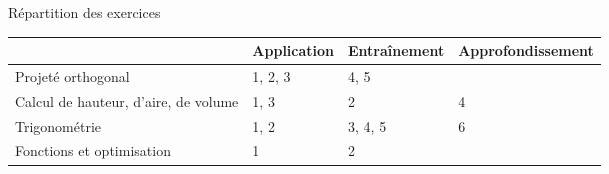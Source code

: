 \documentclass[12pt]{beamer}
\begin{document}
\begin{frame}{Répartition des exercices}

\begin{center}
\begin{tabular}{|P{.2\textwidth}|P{.17\textwidth}|P{.2\textwidth}|P{.28\textwidth}|}\hline
		& Application & Entraînement & Approfondissement \\ \hline
	Projeté orthogonal & 1, 2, 3 & 4, 5 & \\ \hline
	Calcul de hauteur, d'aire, de volume & 1, 3 & 2 & 4 \\ \hline
	Trigonométrie & 1, 2 & 3, 4, 5 & 6 \\ \hline
	Fonctions et optimisation & 1 & 2 & \\ \hline
\end{tabular}
\end{center}

\end{frame}
\end{document}
